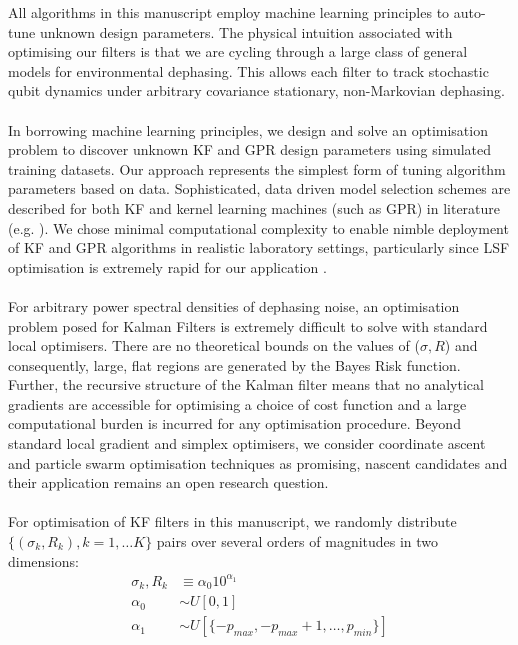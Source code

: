 \documentclass[pra, reprint]{revtex4-1}
\begin{document}
All algorithms in this manuscript employ machine learning principles to auto-tune unknown design parameters. The physical intuition associated with optimising our filters is that we are cycling through a large class of general models for environmental dephasing. This allows each filter to track stochastic qubit dynamics under arbitrary covariance stationary, non-Markovian dephasing. 
\\
\\
In borrowing machine learning principles, we design and solve an optimisation problem to discover unknown KF and GPR design parameters using simulated training datasets. Our approach represents the simplest form of tuning algorithm parameters based on data. Sophisticated, data driven model selection schemes are described for both KF and kernel learning machines (such as GPR) in literature (e.g. \cite{arlot2009data, vu2015understanding}). We chose minimal computational complexity to enable nimble deployment of KF and GPR algorithms in realistic laboratory settings, particularly since LSF optimisation is extremely rapid for our application \cite{mavadia2017}.
\\
\\
For arbitrary power spectral densities of dephasing noise, an optimisation problem posed for Kalman Filters is extremely difficult to solve with standard local optimisers. There are no theoretical bounds on the values of ($\sigma, R$) and consequently, large, flat regions are generated by the Bayes Risk function. Further, the recursive structure of the Kalman filter means that no analytical gradients are accessible for optimising a choice of cost function and a large computational burden is incurred for any optimisation procedure. Beyond standard local gradient and simplex optimisers, we consider coordinate ascent \cite{abbeel2005} and particle swarm optimisation techniques \cite{robertson2017particle} as promising, nascent candidates and their application remains an open research question. 
\\  
\\
For optimisation of KF filters in this manuscript, we randomly distribute $\{(\sigma_{k}, R_{k}), k=1, \hdots K \}$ pairs over several orders of magnitudes in two dimensions:
\begin{align}
\sigma_k, R_k &\equiv \alpha_0 10^{\alpha_1} \\
\alpha_0 & \sim U[0, 1]\\
\alpha_1 & \sim U[\{ -p_{max}, -p_{max} + 1,  \hdots,  p_{min}\}]
\end{align}
\end{document}
